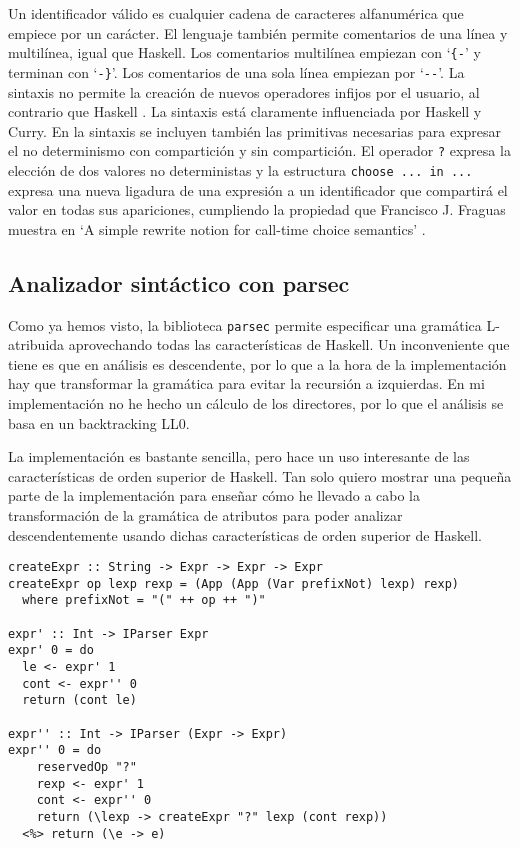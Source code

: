 \documentclass[class=article, crop=false]{standalone}
\begin{document}
Un identificador válido es cualquier cadena de caracteres alfanumérica que empiece por un
carácter. El lenguaje también permite comentarios de una línea y multilínea, igual que
Haskell. Los comentarios multilínea empiezan con `\verb`{-`' y terminan con `\verb`-}`'. Los
comentarios de una sola línea empiezan por `\verb`--`'. La sintaxis no permite la creación de
nuevos operadores infijos por el usuario, al contrario que Haskell \cite{marlow2010haskell}.
La sintaxis está claramente influenciada por Haskell y Curry. En la sintaxis se incluyen
también las primitivas necesarias para expresar el no determinismo con compartición y sin
compartición. El operador \verb`?` expresa la elección de dos valores no deterministas y la
estructura \verb`choose ... in ...` expresa una nueva ligadura de una expresión a un
identificador que compartirá el valor en todas sus apariciones, cumpliendo la propiedad que
Francisco J. Fraguas muestra en `A simple rewrite notion for call-time choice semantics'
\cite{lopez2007simple}.

\subsection{Analizador sintáctico con parsec}\label{sec:analizador_sintactico}

Como ya hemos visto, la biblioteca \verb`parsec` permite especificar una gramática
L-atribuida aprovechando todas las características de Haskell. Un inconveniente que tiene es
que en análisis es descendente, por lo que a la hora de la implementación hay que transformar
la gramática para evitar la recursión a izquierdas. En mi implementación no he hecho un
cálculo de los directores, por lo que el análisis se basa en un backtracking LL0.

La implementación es bastante sencilla, pero hace un uso interesante de las características
de orden superior de Haskell. Tan solo quiero mostrar una pequeña parte de la
implementación para enseñar cómo he llevado a cabo la transformación de la gramática de
atributos para poder analizar descendentemente usando dichas características de orden
superior de Haskell.

\begin{verbatim}
createExpr :: String -> Expr -> Expr -> Expr
createExpr op lexp rexp = (App (App (Var prefixNot) lexp) rexp)
  where prefixNot = "(" ++ op ++ ")"

expr' :: Int -> IParser Expr
expr' 0 = do
  le <- expr' 1
  cont <- expr'' 0
  return (cont le)

expr'' :: Int -> IParser (Expr -> Expr)
expr'' 0 = do
    reservedOp "?"
    rexp <- expr' 1
    cont <- expr'' 0
    return (\lexp -> createExpr "?" lexp (cont rexp))
  <%> return (\e -> e)
\end{verbatim}
\end{document}
